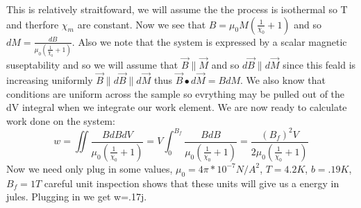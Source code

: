 \documentclass[10pt,a4paper]{article}
\begin{document}
This is relatively straitfoward, we will assume the the process is isothermal so T and therfore $\chi_m$ are constant.  Now we see that $B=\mu_0M(\frac{1}{\chi_0}+1)$ and so $dM=\frac{dB}{\mu_0(\frac{1}{\chi_0}+1)}$.  Also we note that the system is expressed by a scalar magnetic suseptability and so we will assume that $\vec{B}\parallel\vec{M}$ and so $d\vec{B}\parallel d\vec{M}$ since this feald is increasing uniformly $\vec{B}\parallel d\vec{B} \parallel d\vec{M}$ thus $\vec{B} \bullet d\vec{M}=BdM$.  We also know that conditions are uniform across the sample so evrything may be pulled out of the dV integral when we integrate our work element.  We are now ready to calculate work done on the system:
\[w=\iint\frac{BdBdV}{\mu_0(\frac{1}{\chi_0}+1)}=V\int_0^{B_f}\frac{BdB}{\mu_0(\frac{1}{\chi_0}+1)}=\frac{(B_f)^2V}{2\mu_0(\frac{1}{\chi_0}+1)}\]
Now we need only plug in some values, $\mu_0=4\pi*10^{-7}N/A^2$, $T=4.2K$, $b=.19K$, $B_f=1T$ careful unit inspection shows that these units will give us a energy in jules.  Plugging in we get w=.17j.
\end{document}
